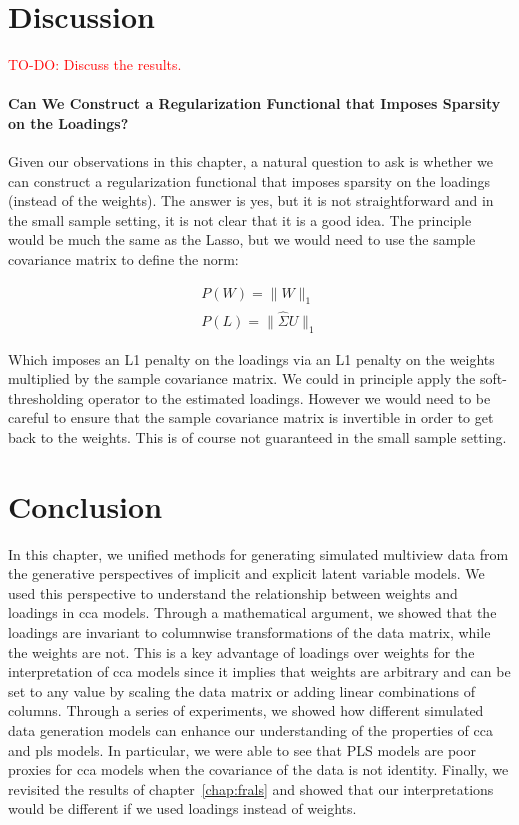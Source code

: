 \section{Discussion}

\textcolor{red}{TO-DO: Discuss the results.}

\paragraph{Can We Construct a Regularization Functional that Imposes Sparsity on the Loadings?}
Given our observations in this chapter, a natural question to ask is whether we can construct a regularization functional that imposes sparsity on the \gls{loadings} (instead of the weights).
The answer is yes, but it is not straightforward and in the small sample setting, it is not clear that it is a good idea.
The principle would be much the same as the Lasso, but we would need to use the sample covariance matrix to define the norm:

\begin{align}
    P(W)=\|W\|_1 \\
    P(L)=\|\hat{\Sigma}U\|_1
\end{align}

Which imposes an L1 penalty on the \gls{loadings} via an L1 penalty on the \gls{weights} multiplied by the sample covariance matrix.
We could in principle apply the soft-thresholding operator to the estimated loadings.
However we would need to be careful to ensure that the sample covariance matrix is invertible in order to get back to the weights.
This is of course not guaranteed in the small sample setting.

\section{Conclusion}

In this chapter, we unified methods for generating simulated multiview data from the generative perspectives of implicit and explicit latent variable models.
We used this perspective to understand the relationship between weights and loadings in \acrshort{cca} models.
Through a mathematical argument, we showed that the \gls{loadings} are invariant to columnwise transformations of the data matrix, while the weights are not.
This is a key advantage of \gls{loadings} over weights for the interpretation of \acrshort{cca} models since it implies that weights are arbitrary and can be set to any value by scaling the data matrix or adding linear combinations of columns.
Through a series of experiments, we showed how different simulated data generation models can enhance our understanding of the properties of \acrshort{cca} and \acrshort{pls} models.
In particular, we were able to see that PLS models are poor proxies for \acrshort{cca} models when the covariance of the data is not identity.
Finally, we revisited the results of chapter~\ref{chap:frals} and showed that our interpretations would be different if we used \gls{loadings} instead of \gls{weights}.